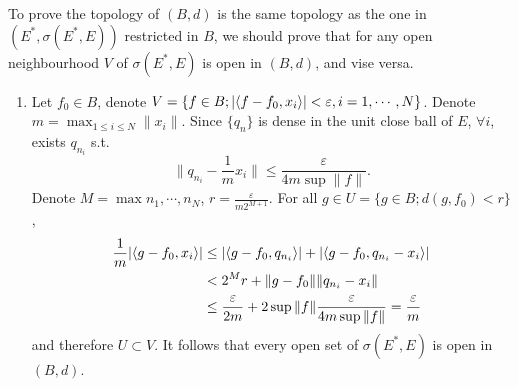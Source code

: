 \begin{enumerate}
\begin{answer}
\begin{enumerate}
        To prove the topology of $(B, d)$ is the same topology as the one in $(E^*, \sigma(E^*, E))$ restricted in $B$, we should prove that for any open neighbourhood $V$ of $\sigma(E^*, E)$ is open in $(B, d)$, and vise versa.

        \begin{enumerate}
            \item Let $f_0\in B$, denote $V = \{f\in B; |\langle f - f_0,x_i\rangle|<\varepsilon, i = 1, \cdots, N\}$. Denote $m = \max_{1\leq i\leq N} \|x_i\|$. Since $\{q_n\}$ is dense in the unit close ball of $E$, $\forall i$, exists $q_{n_i}$ s.t. \[\|q_{n_i} - \frac{1}{m} x_i\|\leq \frac{\varepsilon}{4m\sup\|f\|}. \]
            Denote $M = \max{n_1, \cdots, n_N}$, $r = \frac{\varepsilon}{m2^{M+1}}$. For all $g\in U = \{g\in B; d(g, f_0) < r\}$,
            \[ \begin{aligned}
                \frac1m|\langle g - f_0,x_i\rangle|
                &\leq |\langle g - f_0,q_{n_i}\rangle| + |\langle g - f_0,q_{n_i}-x_i\rangle| \\
                &< 2^{M} r + \|g - f_0\|\|q_{n_i} - x_i\| \\
                &\leq \frac{\varepsilon}{2m} + 2\sup\|f\|\frac{\varepsilon}{4m\sup\|f\|} = \frac\varepsilon m
            \end{aligned} \]
            and therefore $U\subset V$. It follows that every open set of $\sigma(E^*, E)$ is open in $(B, d)$.


\end{enumerate}
\end{enumerate}
\end{answer}
\end{enumerate}
